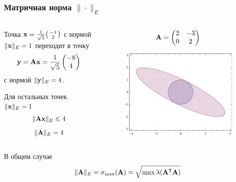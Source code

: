 \documentclass[apectratio=43,unicode]{beamer}
\begin{document}
\begin{frame}
\frametitle{Матричная норма $\|\cdot\|_E$}
	\begin{columns}[T]
	\begin{column}{0.6\textwidth}
	Точка
	${\mathbf{x}} = \frac{1}{\sqrt{5}}\begin{psmallmatrix}
		-1\\2
	\end{psmallmatrix}$
	 с нормой $\|{\mathbf{x}}\|_E = 1$ переходит в точку $${\mathbf{y}} = {\mathbf{A}}{\mathbf{x}} = \frac{1}{\sqrt{5}}\begin{pmatrix}
		-8\\4
	\end{pmatrix}$$
	 с нормой $\|{\mathbf{y}}\|_E = 4$.

	Для остальных точек $\|{\mathbf{x}}\|_E = 1$
	$$\|{\mathbf{A}}{\mathbf{x}}\|_E \leqslant 4$$
	$$
	\|{\mathbf{A}}\|_E = 4
	$$
	\end{column}

	\begin{column}{0.4\textwidth}
	$$
	{\mathbf{A}} = \begin{pmatrix}
		2&-3\\
		0&2
	\end{pmatrix}
	$$
	\begin{figure}%
	\includegraphics[width=\columnwidth]{euclid.pdf}%
	\end{figure}
	\end{column}
	\end{columns}
	\begin{block}{В общем случае}
	$$
	\|{\mathbf{A}}\|_E = \sigma_{\max}({\mathbf{A}}) = \sqrt{\max \lambda({\mathbf{A}}^{\mathsf{T}}{\mathbf{A}})}
	$$
	\end{block}
\end{frame}
\end{document}
